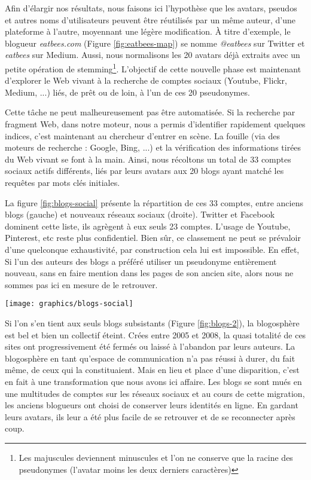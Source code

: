 \documentclass[symmetric,justified,marginals=raggedouter]{tufte-book}
\begin{document}
Afin d'élargir nos résultats, nous faisons ici l'hypothèse que les avatars, pseudos et autres noms d'utilisateurs peuvent être réutilisés par un même auteur, d'une plateforme à l'autre, moyennant une légère modification. À titre d'exemple, le blogueur \textit{eatbees.com} (Figure \ref{fig:eatbees-map}) se nomme \textit{@eatbees} sur Twitter et \textit{eatbees} sur Medium. Aussi, nous normalisons les 20 avatars déjà extraits avec un petite opération de stemming\footnote{Les majuscules deviennent minuscules et l'on ne conserve que la racine des pseudonymes (l'avatar moins les deux derniers caractères)}. L'objectif de cette nouvelle phase est maintenant d'explorer le Web vivant à la recherche de comptes sociaux (Youtube, Flickr, Medium, ...) liés, de prêt ou de loin, à l'un de ces 20 pseudonymes.   

Cette tâche ne peut malheureusement pas être automatisée. Si la recherche par fragment Web, dans notre moteur, nous a permis d'iden\-tifier rapidement quelques indices, c'est maintenant au chercheur d'en\-trer en scène. La fouille (via des moteurs de recherche : Google, Bing, ...) et la vérification des informations tirées du Web vivant se font à la main. Ainsi, nous récoltons un total de 33 comptes sociaux actifs différents, liés par leurs avatars aux 20 blogs ayant matché les requêtes par mots clés initiales. 

La figure \ref{fig:blogs-social} présente la répartition de ces 33 comptes, entre anciens blogs (gauche) et nouveaux réseaux sociaux (droite). Twitter et Facebook dominent cette liste, ils agrègent à eux seuls 23 comptes. L'usage de Youtube, Pinterest, etc reste plus confidentiel. Bien sûr, ce classement ne peut  se prévaloir d'une quelconque exhaustivité, par construction cela lui est impossible. En effet, Si l'un des auteurs des blogs a préféré utiliser un pseudonyme entièrement nouveau, sans en faire mention dans les pages de son ancien site, alors nous ne sommes pas ici en mesure de le retrouver.

\begin{figure*}
  \texttt{[image: graphics/blogs-social]}
  \caption{Liste des blogs de 2008 liés à des réseaux sociaux en 2018}
  \label{fig:blogs-social}
\end{figure*} 

\noindent Si l'on s'en tient aux seuls blogs subsistants (Figure \ref{fig:blogs-2}), la blogosphère est bel et bien un collectif éteint. Crées entre 2005 et 2008, la quasi totalité de ces sites ont progressivement été fermés ou laissé à l'abandon par leurs auteurs. La blogosphère en tant qu'espace de communication n'a pas réussi à durer, du fait même, de ceux qui la constituaient. Mais en lieu et place d'une disparition, c'est en fait à une transformation que nous avons ici affaire. Les blogs se sont mués en une multitudes de comptes sur les réseaux sociaux et au cours de cette migration, les anciens blogueurs ont choisi de conserver leurs identités en ligne. En gardant leurs avatars, ils leur a été plus facile de se retrouver et de se reconnecter après coup.
\end{document}
